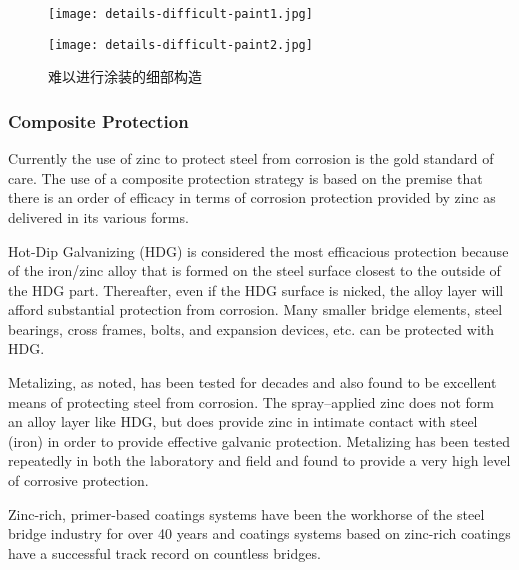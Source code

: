 \begin{figure}
  \begin{minipage}{0.4\linewidth}\centering
    \texttt{[image: details-difficult-paint1.jpg]}
  \end{minipage}
  \begin{minipage}{0.4\linewidth}\centering
    \texttt{[image: details-difficult-paint2.jpg]}
  \end{minipage}
  \caption{难以进行涂装的细部构造}
  \label{fig:details-difficult-paint}
\end{figure}

\subsubsection{Composite Protection}
\label{subsubsec:composite-protection}
Currently the use of zinc to protect steel from corrosion is the gold standard of care. The use of a composite
protection strategy is based on the premise that there is an order of efficacy in terms of corrosion protection provided
by zinc as delivered in its various forms.

Hot-Dip Galvanizing (HDG) is considered the most efficacious protection because of the iron/zinc alloy that is
formed on the steel surface closest to the outside of the HDG part. Thereafter, even if the HDG surface is nicked, the
alloy layer will afford substantial protection from corrosion. Many smaller bridge elements, steel bearings, cross
frames, bolts, and expansion devices, etc. can be protected with HDG.

Metalizing, as noted, has been tested for decades and also found to be excellent means of protecting steel from
corrosion. The spray–applied zinc does not form an alloy layer like HDG, but does provide zinc in intimate contact
with steel (iron) in order to provide effective galvanic protection. Metalizing has been tested repeatedly in both the
laboratory and field and found to provide a very high level of corrosive protection.

Zinc-rich, primer-based coatings systems have been the workhorse of the steel bridge industry for over 40 years
and coatings systems based on zinc-rich coatings have a successful track record on countless bridges.

